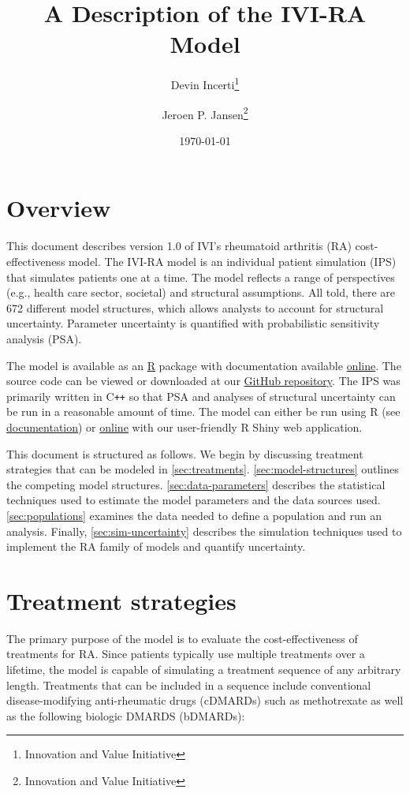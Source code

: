 \documentclass[11pt,final,fleqn]{article}\usepackage[]{graphicx}\usepackage[]{color}
\title{A Description of the IVI-RA Model}
\author{Devin Incerti\footnote{Innovation and Value Initiative} \and Jeroen P. Jansen\footnote{Innovation and Value Initiative}}
\date{\today}
\theoremstyle{plain}
\newcommand\CPP{{C\texttt{++}}}
\newcommand\R{{\textsf{R}}}
\begin{document}
\maketitle

\begingroup
 \hypersetup{linkcolor=black} \tableofcontents
 \listoffigures
 \listoftables
\endgroup



\section{Overview}\label{overview}

This document describes version 1.0 of IVI's rheumatoid arthritis (RA) cost-effectiveness model. The IVI-RA model is an individual patient simulation (IPS) that simulates patients one at a time. The model reflects a range of perspectives (e.g., health care sector, societal) and structural assumptions. All told, there are 672 different model structures, which allows analysts to account for structural uncertainty. Parameter uncertainty is quantified with probabilistic sensitivity analysis (PSA).

The model is available as an \href{https://cran.r-project.org/}{\R{}} package with documentation available \href{https://innovationvalueinitiative.github.io/IVI-RA/index.html}{online}. The source code can be viewed or downloaded at our \href{https://github.com/InnovationValueInitiative/IVI-RA}{GitHub repository}. The IPS was primarily written in \CPP{} so that PSA and analyses of structural uncertainty can be run in a reasonable amount of time. The model can either be run using \R{} (see \href{https://innovationvalueinitiative.github.io/IVI-RA/index.html}{documentation}) or \href{http://www.shinyapps.io/}{online} with our user-friendly R Shiny web application. 

This document is structured as follows. We begin by discussing treatment strategies that can be modeled in \autoref{sec:treatments}. \autoref{sec:model-structures} outlines the competing model structures. \autoref{sec:data-parameters} describes the statistical techniques used to estimate the model parameters and the data sources used. \autoref{sec:populations} examines the data needed to define a population and run an analysis. Finally, \autoref{sec:sim-uncertainty} describes the simulation techniques used to implement the RA family of models and quantify uncertainty.

\section{Treatment strategies}\label{sec:treatments}
The primary purpose of the model is to evaluate the cost-effectiveness of treatments for RA. Since patients typically use multiple treatments over a lifetime, the model is capable of simulating a treatment sequence of any arbitrary length. Treatments that can be included in a sequence include conventional disease-modifying anti-rheumatic drugs (cDMARDs) such as methotrexate as well as the following biologic DMARDS (bDMARDs):
\end{document}
